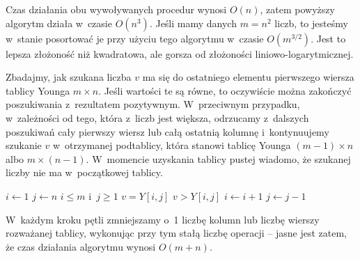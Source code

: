 Czas działania obu wywoływanych procedur wynosi $O(n)$, zatem powyższy algorytm działa w~czasie $O(n^3)$. Jeśli mamy danych $m=n^2$ liczb, to jesteśmy w~stanie posortować je przy użyciu tego algorytmu w~czasie $O(m^{3/2})$. Jest to lepsza złożoność niż kwadratowa, ale gorsza od złożoności liniowo-logarytmicznej.

\subproblem %
Zbadajmy, jak szukana liczba $v$ ma się do ostatniego elementu pierwszego wiersza tablicy Younga $m\times n$. Jeśli wartości te są równe, to oczywiście można zakończyć poszukiwania z~rezultatem pozytywnym. W~przeciwnym przypadku, w~zależności od tego, która z~liczb jest większa, odrzucamy z~dalszych poszukiwań cały pierwszy wiersz lub całą ostatnią kolumnę i~kontynuujemy szukanie $v$ w~otrzymanej podtablicy, która stanowi tablicę Younga $(m-1)\times n$ albo $m\times(n-1)$. W~momencie uzyskania tablicy pustej wiadomo, że szukanej liczby nie ma w~początkowej tablicy.
\begin{codebox}
\li	$i\gets1$
\li	$j\gets n$
\li	\While $i\le m$ i~$j\ge1$
\li		\Do
			\If $v=Y[i,j]$
\li				\Then \Return {}
				\End
\li			\If $v>Y[i,j]$
\li				\Then $i\gets i+1$
\li				\Else $j\gets j-1$
				\End
		\End
\li	\Return {}
\end{codebox}

W~każdym kroku pętli  zmniejszamy o~1 liczbę kolumn lub liczbę wierszy rozważanej tablicy, wykonując przy tym stałą liczbę operacji -- jasne jest zatem, że czas działania algorytmu wynosi $O(m+n)$.

\endinput
